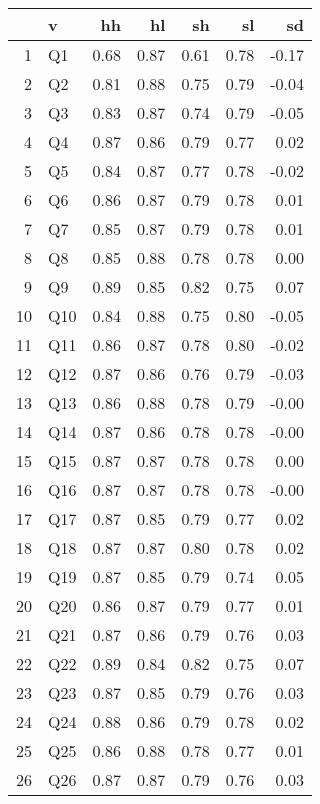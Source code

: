 \documentclass{amsart}
\begin{document}
\begin{table}[ht]
\centering
\begin{tabular}{rlrrrrr}
  \hline
 & v & hh & hl & sh & sl & sd \\ 
  \hline
1 & Q1 & 0.68 & 0.87 & 0.61 & 0.78 & -0.17 \\ 
  2 & Q2 & 0.81 & 0.88 & 0.75 & 0.79 & -0.04 \\ 
  3 & Q3 & 0.83 & 0.87 & 0.74 & 0.79 & -0.05 \\ 
  4 & Q4 & 0.87 & 0.86 & 0.79 & 0.77 & 0.02 \\ 
  5 & Q5 & 0.84 & 0.87 & 0.77 & 0.78 & -0.02 \\ 
  6 & Q6 & 0.86 & 0.87 & 0.79 & 0.78 & 0.01 \\ 
  7 & Q7 & 0.85 & 0.87 & 0.79 & 0.78 & 0.01 \\ 
  8 & Q8 & 0.85 & 0.88 & 0.78 & 0.78 & 0.00 \\ 
  9 & Q9 & 0.89 & 0.85 & 0.82 & 0.75 & 0.07 \\ 
  10 & Q10 & 0.84 & 0.88 & 0.75 & 0.80 & -0.05 \\ 
  11 & Q11 & 0.86 & 0.87 & 0.78 & 0.80 & -0.02 \\ 
  12 & Q12 & 0.87 & 0.86 & 0.76 & 0.79 & -0.03 \\ 
  13 & Q13 & 0.86 & 0.88 & 0.78 & 0.79 & -0.00 \\ 
  14 & Q14 & 0.87 & 0.86 & 0.78 & 0.78 & -0.00 \\ 
  15 & Q15 & 0.87 & 0.87 & 0.78 & 0.78 & 0.00 \\ 
  16 & Q16 & 0.87 & 0.87 & 0.78 & 0.78 & -0.00 \\ 
  17 & Q17 & 0.87 & 0.85 & 0.79 & 0.77 & 0.02 \\ 
  18 & Q18 & 0.87 & 0.87 & 0.80 & 0.78 & 0.02 \\ 
  19 & Q19 & 0.87 & 0.85 & 0.79 & 0.74 & 0.05 \\ 
  20 & Q20 & 0.86 & 0.87 & 0.79 & 0.77 & 0.01 \\ 
  21 & Q21 & 0.87 & 0.86 & 0.79 & 0.76 & 0.03 \\ 
  22 & Q22 & 0.89 & 0.84 & 0.82 & 0.75 & 0.07 \\ 
  23 & Q23 & 0.87 & 0.85 & 0.79 & 0.76 & 0.03 \\ 
  24 & Q24 & 0.88 & 0.86 & 0.79 & 0.78 & 0.02 \\ 
  25 & Q25 & 0.86 & 0.88 & 0.78 & 0.77 & 0.01 \\ 
  26 & Q26 & 0.87 & 0.87 & 0.79 & 0.76 & 0.03 \\ 

\end{tabular}
\end{table}
\end{document}
